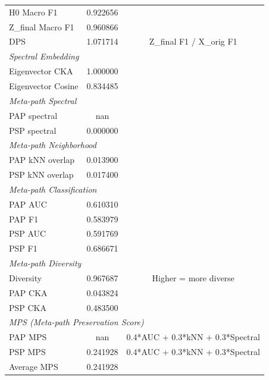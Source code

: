\begin{landscape}
\begin{table}[h]
\begin{tabular}{lcc}
H0 Macro F1 & 0.922656 &  \\
Z_final Macro F1 & 0.960866 &  \\
DPS & 1.071714 & Z_final F1 / X_orig F1 \\
\midrule
\multicolumn{3}{l}{\textit{Spectral Embedding}} \\
Eigenvector CKA & 1.000000 &  \\
Eigenvector Cosine & 0.834485 &  \\
\midrule
\multicolumn{3}{l}{\textit{Meta-path Spectral}} \\
PAP spectral & nan &  \\
PSP spectral & 0.000000 &  \\
\midrule
\multicolumn{3}{l}{\textit{Meta-path Neighborhood}} \\
PAP kNN overlap & 0.013900 &  \\
PSP kNN overlap & 0.017400 &  \\
\midrule
\multicolumn{3}{l}{\textit{Meta-path Classification}} \\
PAP AUC & 0.610310 &  \\
PAP F1 & 0.583979 &  \\
PSP AUC & 0.591769 &  \\
PSP F1 & 0.686671 &  \\
\midrule
\multicolumn{3}{l}{\textit{Meta-path Diversity}} \\
Diversity & 0.967687 & Higher = more diverse \\
PAP CKA & 0.043824 &  \\
PSP CKA & 0.483500 &  \\
\midrule
\multicolumn{3}{l}{\textit{MPS (Meta-path Preservation Score)}} \\
PAP MPS & nan & 0.4*AUC + 0.3*kNN + 0.3*Spectral \\
PSP MPS & 0.241928 & 0.4*AUC + 0.3*kNN + 0.3*Spectral \\
Average MPS & 0.241928 &  \\
\bottomrule
\end{tabular}
\end{table}
\end{landscape}
